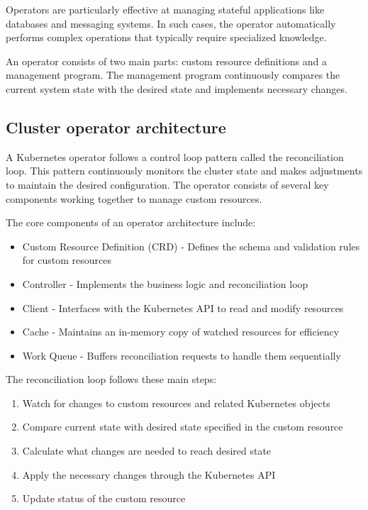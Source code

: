 Operators are particularly effective at managing stateful applications like databases and messaging systems.
In such cases, the operator automatically performs complex operations that typically require specialized knowledge.

An operator consists of two main parts: custom resource definitions and a management program.
The management program continuously compares the current system state with the desired state and implements necessary changes.

\subsection{Cluster operator architecture}

A Kubernetes operator follows a control loop pattern called the reconciliation loop.
This pattern continuously monitors the cluster state and makes adjustments to maintain the desired configuration.
The operator consists of several key components working together to manage custom resources.

The core components of an operator architecture include:

\begin{itemize}
    \item Custom Resource Definition (CRD) - Defines the schema and validation rules for custom resources
    \item Controller - Implements the business logic and reconciliation loop
    \item Client - Interfaces with the Kubernetes API to read and modify resources
    \item Cache - Maintains an in-memory copy of watched resources for efficiency
    \item Work Queue - Buffers reconciliation requests to handle them sequentially
\end{itemize}

The reconciliation loop follows these main steps:
\begin{enumerate}
    \item Watch for changes to custom resources and related Kubernetes objects
    \item Compare current state with desired state specified in the custom resource
    \item Calculate what changes are needed to reach desired state
    \item Apply the necessary changes through the Kubernetes API
    \item Update status of the custom resource
\end{enumerate}

